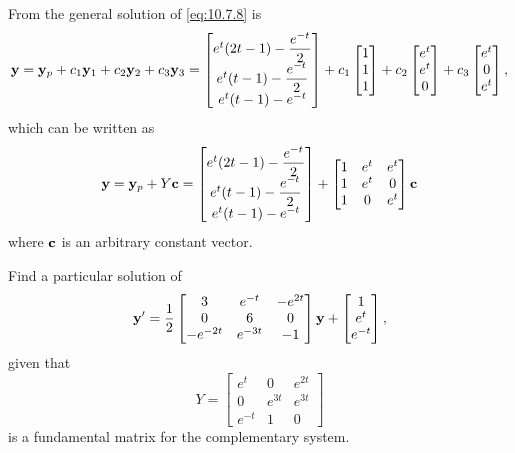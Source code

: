 \begin{alistSolution}
\item From  the general solution of
\eqref{eq:10.7.8} is
\[
\mathbf{y}=\mathbf{y}_p+c_1\mathbf{y}_1+c_2\mathbf{y}_2+c_3\mathbf{y}_3=
\begin{bmatrix}
e^t(2t-1)-\dfrac{e^{-t}}{2}\\e^t(t-1)-\dfrac{e^{-t}}{2}\\e^t(t-1)-e^{-t}
\end{bmatrix}+
c_1\begin{bmatrix}1\\1\\1\end{bmatrix}+
c_2\begin{bmatrix}e^t\\e^t\\0\end{bmatrix}
+c_3\begin{bmatrix}e^t\\0\\e^t\end{bmatrix},
\]
which can  be written as
\[
\mathbf{y}=\mathbf{y}_p+Y\mathbf{c}=
\begin{bmatrix}
e^t(2t-1)-\dfrac{e^{-t}}{2}\\e^t(t-1)-\dfrac{e^{-t}}{2}\\e^t(t-1)-e^{-t}
\end{bmatrix}+
\begin{bmatrix}1&e^t&e^t\\1&e^t&0\\1&0&e^t\end{bmatrix}\mathbf{c}
\]
where $\mathbf{c}$ is an arbitrary constant vector.
\end{alistSolution}

\begin{example}\label{example:10.7.5}
Find a particular solution of
\begin{equation} \label{eq:10.7.10}
\mathbf{y}'=\frac{1}{2}
\begin{bmatrix}3&e^{-t}&-e^{2t}\\0&6&0\\-e^{-2t}&e^{-3t}&-1\end{bmatrix}
\mathbf{y}+\begin{bmatrix}1\\e^t\\e^{-t}\end{bmatrix},
\end{equation}
given that
\[
Y=\begin{bmatrix}e^t&0&e^{2t}\\0&e^{3t}&e^{3t}\\e^{-t}&1&0\end{bmatrix}
\]
is a fundamental matrix for the complementary system.
\end{example}

